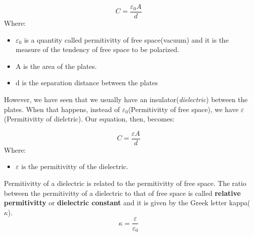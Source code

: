 \documentclass[9pt]{exam}
\begin{document}
	\begin{equation}
		C = \frac{\varepsilon_0A}{d}
	\end{equation}
	Where:
	\begin{itemize}
		\item $\varepsilon_0$ is a quantity called permitivitty of free space(vacuum) and it is the measure of the tendency of free space to be polarized. 
		\item A is the area of the plates.
		\item d is the separation distance between the plates
	\end{itemize}
	However, we have seen that we usually have an insulator(\textit{dielectric}) between the plates. When that happens, instead of $\varepsilon_0$(Permitivitty of free space), we have $\varepsilon$(Permitivitty of dielctric). Our equation, then, becomes:
	
	$$ C = \frac{\varepsilon A}{d}$$
	Where:
	\begin{itemize}
		\item $\varepsilon$ is the permitivitty of the dielectric.
	\end{itemize}    
	Permitivitty of a dielectric is related to the permitivitty of free space. The ratio between the permitivitty of a dielectric to that of free space is called \textbf{relative permitivitty} or \textbf{dielectric constant} and it is given by the Greek letter kappa($\kappa$).
	$$\kappa = \frac{\varepsilon}{\varepsilon_0}$$	
\end{document}
